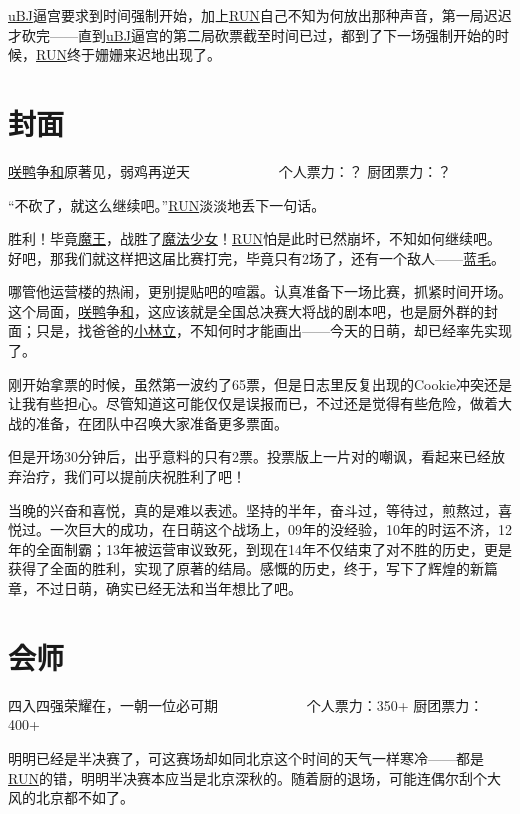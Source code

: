 \uline{uBJ}逼宫要求到时间强制开始，加上\uline{RUN}自己不知为何放出那种声音，第一局迟迟才砍完——直到\uline{uBJ}逼宫的第二局砍票截至时间已过，都到了下一场强制开始的时候，\uline{RUN}终于姗姗来迟地出现了。

\chapter{封面}
\begin{center}
{\subTitle \uline{咲}\uline{鸭}争\uline{和}原著见，弱鸡再逆天}
\subMemo
　　　　　　个人票力：？ 厨团票力：？
\end{center}

“不砍了，就这么继续吧。”\uline{RUN}淡淡地丢下一句话。

胜利！毕竟\uline{魔王}，战胜了\uline{魔法少女}！\uline{RUN}怕是此时已然崩坏，不知如何继续吧。好吧，那我们就这样把这届比赛打完，毕竟只有2场了，还有一个敌人——\uline{蓝毛}。

哪管他运营楼的热闹，更别提贴吧的喧嚣。认真准备下一场比赛，抓紧时间开场。这个局面，\uline{咲}\uline{鸭}争\uline{和}，这应该就是全国总决赛大将战的剧本吧，也是厨外群的封面；只是，找爸爸的\uline{小林立}，不知何时才能画出——今天的日萌，却已经率先实现了。

刚开始拿票的时候，虽然第一波约了65票，但是日志里反复出现的Cookie冲突还是让我有些担心。尽管知道这可能仅仅是误报而已，不过还是觉得有些危险，做着大战的准备，在团队中召唤大家准备更多票面。

但是开场30分钟后，出乎意料的只有2票。投票版上一片对的嘲讽，看起来已经放弃治疗，我们可以提前庆祝胜利了吧！

\SUETEXT

当晚的兴奋和喜悦，真的是难以表述。坚持的半年，奋斗过，等待过，煎熬过，喜悦过。一次巨大的成功，在日萌这个战场上，09年的没经验，10年的时运不济，12年的全面制霸；13年被运营审议致死，到现在14年不仅结束了对不胜的历史，更是获得了全面的胜利，实现了原著的结局。感慨的历史，终于，写下了辉煌的新篇章，不过日萌，确实已经无法和当年想比了吧。

\chapter{会师}
\begin{center}
{\subTitle 四入四强荣耀在，一朝一位必可期}
\subMemo
　　　　　　个人票力：350+ 厨团票力：400+
\end{center}

明明已经是半决赛了，可这赛场却如同北京这个时间的天气一样寒冷——都是\uline{RUN}的错，明明半决赛本应当是北京深秋的。随着厨的退场，可能连偶尔刮个大风的北京都不如了。

